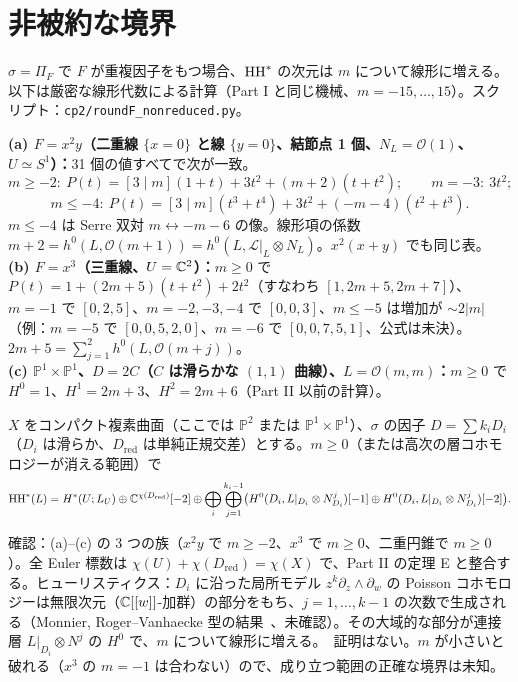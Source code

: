 \section{非被約な境界}\label{sec:nonred}
$\sigma=\Pi_F$ で $F$ が重複因子をもつ場合、$\mathrm{HH}^*$ の次元は $m$ について線形に増える。以下は厳密な線形代数による計算（Part I と同じ機械、$m=-15,\dots,15$）。スクリプト：\texttt{cp2/roundF\_nonreduced.py}。
\begin{obs}\tV\label{obs:nr}
\textbf{(a) $F=x^2y$（二重線 $\{x=0\}$ と線 $\{y=0\}$、結節点 1 個、$N_L=\mathcal O(1)$、$U\simeq S^1$）：}31 個の値すべてで次が一致。
\[m\ge-2:\ P(t)=[3\mid m](1+t)+3t^2+(m+2)(t+t^2);\qquad m=-3:\ 3t^2;\]
\[m\le-4:\ P(t)=[3\mid m](t^3+t^4)+3t^2+(-m-4)(t^2+t^3).\]
$m\le-4$ は Serre 双対 $m\leftrightarrow-m-6$ の像。線形項の係数 $m+2=h^0(L,\mathcal O(m+1))=h^0(L,\mathcal L|_L\otimes N_L)$。$x^2(x+y)$ でも同じ表。\\
\textbf{(b) $F=x^3$（三重線、$U=\mathbb C^2$）：}$m\ge0$ で $P(t)=1+(2m+5)(t+t^2)+2t^2$（すなわち $[1,2m+5,2m+7]$）、$m=-1$ で $[0,2,5]$、$m=-2,-3,-4$ で $[0,0,3]$、$m\le-5$ は増加が $\sim2|m|$（例：$m=-5$ で $[0,0,5,2,0]$、$m=-6$ で $[0,0,7,5,1]$、公式は未決）。$2m+5=\sum_{j=1}^2h^0(L,\mathcal O(m+j))$。\\
\textbf{(c) $\mathbb P^1\times\mathbb P^1$、$D=2C$（$C$ は滑らかな $(1,1)$ 曲線）、$L=\mathcal O(m,m)$：}$m\ge0$ で $H^0=1$、$H^1=2m+3$、$H^2=2m+6$（Part II 以前の計算）。
\end{obs}
\begin{conj}[非被約な境界]\tK\label{conj:NR}
$X$ をコンパクト複素曲面（ここでは $\mathbb P^2$ または $\mathbb P^1\times\mathbb P^1$）、$\sigma$ の因子 $D=\sum k_iD_i$（$D_i$ は滑らか、$D_{\mathrm{red}}$ は単純正規交差）とする。$m\ge0$（または高次の層コホモロジーが消える範囲）で
\[\mathrm{HH}^*(L)=H^*(U;L_U)\oplus\mathbb C^{\chi(D_{\mathrm{red}})}[-2]\oplus\bigoplus_i\bigoplus_{j=1}^{k_i-1}\bigl(H^0(D_i,L|_{D_i}\otimes N_{D_i}^{j})[-1]\oplus H^0(D_i,L|_{D_i}\otimes N_{D_i}^{j})[-2]\bigr).\]
\end{conj}
\noindent 確認：(a)--(c) の 3 つの族（$x^2y$ で $m\ge-2$、$x^3$ で $m\ge0$、二重円錐で $m\ge0$）。全 Euler 標数は $\chi(U)+\chi(D_{\mathrm{red}})=\chi(X)$ で、Part II の定理 E と整合する。ヒューリスティクス：$D_i$ に沿った局所モデル $z^k\partial_z\wedge\partial_w$ の Poisson コホモロジーは無限次元（$\mathbb C[[w]]$-加群）の部分をもち、$j=1,\dots,k-1$ の次数で生成される（Monnier, Roger--Vanhaecke 型の結果\tC\ \tQ、未確認）。その大域的な部分が連接層 $L|_{D_i}\otimes N^j$ の $H^0$ で、$m$ について線形に増える。\tK\ 証明はない。$m$ が小さいと破れる（$x^3$ の $m=-1$ は合わない）ので、成り立つ範囲の正確な境界は未知。

